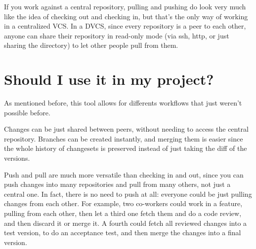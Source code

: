 \documentclass[%
	final,
	notitlepage,
	narroweqnarray,
	inline,
	twoside,
	]{ieee}
\begin{document}
If you work against a central repository, pulling and pushing do look very much like
the idea of checking out and checking in, but that's the only way of working in a centralized VCS.
In a DVCS, since every repository is a peer to each other, anyone can share their repository in 
read-only mode (via ssh, http, or just sharing the directory) to let other people pull from them. 



\section{Should I use it in my project?}

As mentioned before, this tool allows for differents workflows that just weren't 
possible before.

Changes can be just shared between peers, without needing to access the central 
repository. Branches can be created instantly, and merging them is easier since 
the whole history of changesets is preserved instead of just taking the diff of 
the versions.

Push and pull are much more versatile than checking in and out, since you can push 
changes into many repositories and pull from many others, not just a central one.
In fact, there is no need to push at all:
everyone could be just pulling changes from each other. For example, two co-workers could work 
in a feature, pulling from each other, then let a third one fetch them and do a code review, and then 
discard it or merge it. A fourth could fetch all reviewed changes into a test version, to do an 
acceptance test, and then merge the changes into a final version.


\end{document}

